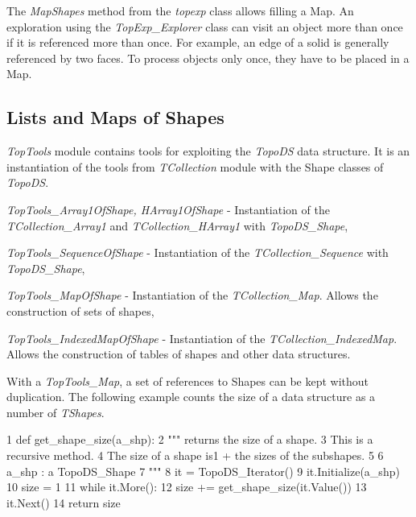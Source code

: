 The {\itshape Map\+Shapes} method from the {\itshape topexp} class allows filling a Map. An exploration using the {\itshape Top\+Exp\+\_\+\+Explorer} class can visit an object more than once if it is referenced more than once. For example, an edge of a solid is generally referenced by two faces. To process objects only once, they have to be placed in a Map.\hypertarget{occt_user_guides__modeling_data_occt_modat_5_5}{}\subsection{Lists and Maps of Shapes}\label{occt_user_guides__modeling_data_occt_modat_5_5}
{\itshape Top\+Tools} module contains tools for exploiting the {\itshape Topo\+DS} data structure. It is an instantiation of the tools from {\itshape T\+Collection} module with the Shape classes of {\itshape Topo\+DS}.


\begin{DoxyItemize}
\item {\itshape Top\+Tools\+\_\+\+Array1\+Of\+Shape, H\+Array1\+Of\+Shape} -\/ Instantiation of the {\itshape T\+Collection\+\_\+\+Array1} and {\itshape T\+Collection\+\_\+\+H\+Array1} with {\itshape Topo\+D\+S\+\_\+\+Shape},
\item {\itshape Top\+Tools\+\_\+\+Sequence\+Of\+Shape} -\/ Instantiation of the {\itshape T\+Collection\+\_\+\+Sequence} with {\itshape Topo\+D\+S\+\_\+\+Shape},
\item {\itshape Top\+Tools\+\_\+\+Map\+Of\+Shape} -\/ Instantiation of the {\itshape T\+Collection\+\_\+\+Map}. Allows the construction of sets of shapes,
\item {\itshape Top\+Tools\+\_\+\+Indexed\+Map\+Of\+Shape} -\/ Instantiation of the {\itshape T\+Collection\+\_\+\+Indexed\+Map}. Allows the construction of tables of shapes and other data structures.
\end{DoxyItemize}

With a {\itshape Top\+Tools\+\_\+\+Map}, a set of references to Shapes can be kept without duplication. The following example counts the size of a data structure as a number of {\itshape T\+Shapes}.


\begin{DoxyCode}
1 \textcolor{keyword}{def }get\_shape\_size(a\_shp):
2   \textcolor{stringliteral}{""" returns the size of a shape.}
3 \textcolor{stringliteral}{  This is a recursive method. }
4 \textcolor{stringliteral}{  The size of a shape is1 + the sizes of the subshapes. }
5 \textcolor{stringliteral}{}
6 \textcolor{stringliteral}{  a\_shp : a TopoDS\_Shape}
7 \textcolor{stringliteral}{  """}
8   it = TopoDS\_Iterator()
9   it.Initialize(a\_shp)
10   size = 1 
11   \textcolor{keywordflow}{while} it.More():
12    size += get\_shape\_size(it.Value())
13    it.Next()
14  \textcolor{keywordflow}{return} size
\end{DoxyCode}


